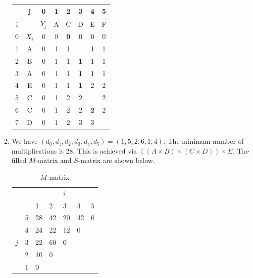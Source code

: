 \documentclass[11pt, letterpaper, titlepage]{article}
\newcommand{\textbr}[1]{\textbf{\color{red}{#1}}}
\begin{document}
\begin{enumerate}[label=\alph*.]
    \footnotesize
    \begin{tabularx}{\textwidth}{|c|c|c|c|c|c|c|c|}
        \hline
          &     j &          0 &          1 &          2 &          3 &          4 &          5 \\ \hline
        i &       &      $Y_j$ &          A &          C &          D &          E &          F \\ \hline
        0 & $X_i$ &          0 &          0 & \textbf{0} &          0 &          0 &          0 \\ \hline
        1 &     A &          0 &          1 &          1 & \textbr{1} &          1 &          1 \\ \hline
        2 &     B &          0 &          1 &          1 & \textbf{1} &          1 &          1 \\ \hline
        3 &     A &          0 &          1 &          1 & \textbf{1} &          1 &          1 \\ \hline
        4 &     E &          0 &          1 &          1 & \textbf{1} &          2 &          2 \\ \hline
        5 &     C &          0 &          1 &          2 &          2 & \textbr{2} &          2 \\ \hline
        6 &     C &          0 &          1 &          2 &          2 & \textbf{2} &          2 \\ \hline
        7 &     D &          0 &          1 &          2 &          3 &          3 & \textbr{3} \\ \hline
    \end{tabularx}
    \normalsize

    \item We have $(d_0, d_1, d_2, d_3, d_4, d_5) = (1, 5, 2, 6, 1, 4)$. The minimum number of multiplications is 28. This is achieved via $((A \times B) \times (C \times D)) \times E$. The filled $M$-matrix and $S$-matrix are shown below.
    \begin{paracol}{2}
        {
            \renewcommand{\arraystretch}{1.5}
            \begin{table}[H]
                \footnotesize
                \centering
                \caption*{$M$-matrix}
                \begin{tabular}{P{1em}P{1em}|P{1em}P{1em}P{1em}P{1em}P{1em}}
                        &&&& $i$ && \\
                        &   & 1  & 2  & 3  & 4  & 5 \\ \hline
                        & 5 & 28 & 42 & 20 & 42 & 0 \\
                        & 4 & 24 & 22 & 12 & 0  &   \\
                    $j$ & 3 & 22 & 60 &  0 &    &   \\
                        & 2 & 10 &  0 &    &    &   \\
                        & 1 &  0 &    &    &    &   \\
                \end{tabular}
            \end{table}
        }


\end{paracol}
\end{enumerate}
\end{document}
